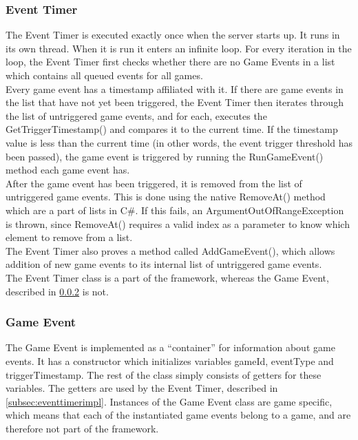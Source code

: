 \subsubsection{Event Timer}
\label{sec:eventtimerimpl}
The Event Timer is executed exactly once when the server starts up. It runs in its own thread. When it is run it enters an infinite loop. For every iteration in the loop, the Event Timer first checks whether there are no Game Events in a list which contains all queued events for all games.\\

Every game event has a timestamp affiliated with it. If there are game events in the list that have not yet been triggered, the Event Timer then iterates through the list of untriggered game events, and for each, executes the GetTriggerTimestamp() and compares it to the current time. If the timestamp value is less than the current time (in other words, the event trigger threshold has been passed), the game event is triggered by running the RunGameEvent() method each game event has.\\

After the game event has been triggered, it is removed from the list of untriggered game events. This is done using the native RemoveAt() method which are a part of lists in C\#. If this fails, an ArgumentOutOfRangeException is thrown, since RemoveAt() requires a valid index as a parameter to know which element to remove from a list.\\

The Event Timer also proves a method called AddGameEvent(), which allows addition of new game events to its internal list of untriggered game events.\\

The Event Timer class is a part of the framework, whereas the Game Event, described in \cref{subsec:geventImpl} is not.
\subsubsection{Game Event}\label{subsec:geventImpl}
The Game Event is implemented as a ``container'' for information about game events. It has a constructor which initializes variables gameId, eventType and triggerTimestamp. The rest of the class simply consists of getters for these variables. The getters are used by the Event Timer, described in \cref{subsec:eventtimerimpl}. Instances of the Game Event class are game specific, which means that each of the instantiated game events belong to a game, and are therefore not part of the framework.
